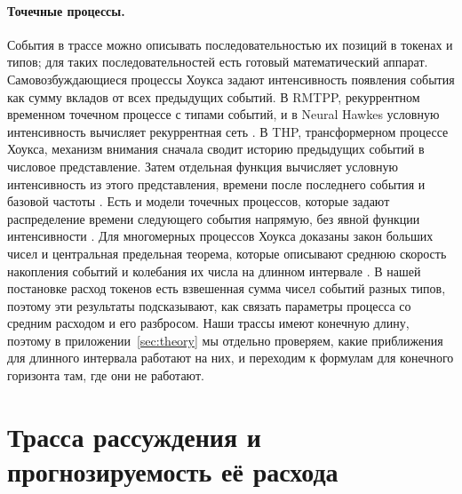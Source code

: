 \documentclass[11pt]{article}
\begin{document}
\paragraph{Точечные процессы.} События в трассе можно описывать последовательностью их позиций в токенах и типов; для таких последовательностей есть готовый математический аппарат. Самовозбуждающиеся процессы Хоукса \citep{hawkes1971,hawkes1974cluster} задают интенсивность появления события как сумму вкладов от всех предыдущих событий. В RMTPP, рекуррентном временном точечном процессе с типами событий, и в Neural Hawkes условную интенсивность вычисляет рекуррентная сеть \citep{du2016rmtpp,mei2017neuralhawkes}. В THP, трансформерном процессе Хоукса, механизм внимания сначала сводит историю предыдущих событий в числовое представление. Затем отдельная функция вычисляет условную интенсивность из этого представления, времени после последнего события и базовой частоты \citep{zuo2020thp}. Есть и модели точечных процессов, которые задают распределение времени следующего события напрямую, без явной функции интенсивности \citep{shchur2020intensityfree,shchur2021review}. Для многомерных процессов Хоукса доказаны закон больших чисел и центральная предельная теорема, которые описывают среднюю скорость накопления событий и колебания их числа на длинном интервале \citep{bacry2013limit}. В нашей постановке расход токенов есть взвешенная сумма чисел событий разных типов, поэтому эти результаты подсказывают, как связать параметры процесса со средним расходом и его разбросом. Наши трассы имеют конечную длину, поэтому в приложении~\ref{sec:theory} мы отдельно проверяем, какие приближения для длинного интервала работают на них, и переходим к формулам для конечного горизонта там, где они не работают.

\section{Трасса рассуждения и прогнозируемость её расхода}
\label{sec:traces}
\end{document}
